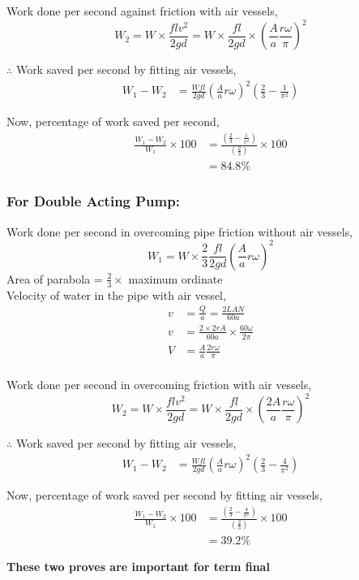 \documentclass{article}
\begin{document}
\begin{multicols}{2}
      Work done per second against friction with air vessels,
      $$W_2 = W \times \frac{f l v^2}{2 g d} = W \times \frac{f l}{2 g d} \times \left(\frac{A}{a} \frac{r \omega}{\pi}\right)^2 $$

      $\therefore$ Work saved per second by fitting air vessels,
      \begin{align*}
        W_1 - W_2 &= \frac{W f l}{2 g d} \left(\frac{A}{a} r \omega\right)^2 \left(\frac{2}{3} - \frac{1}{\pi^2}\right)
      \end{align*}
      
      Now, percentage of work saved per second,
      \begin{align*}
        \frac{W_1 - W_2}{W_1} \times 100 &= \frac{\left(\frac{2}{3} - \frac{1}{\pi^2}\right)}{\left(\frac{2}{3}\right)} \times 100 \\
        &= 84.8 \%
      \end{align*}

      \subsubsection*{For Double Acting Pump:}
      Work done per second in overcoming pipe friction without air vessels,
      $$W_1 = W \times \frac{2}{3} \frac{fl}{2 g d} \left(\frac{A}{a} r \omega \right)^2 $$
      Area of parabola = $\frac{2}{3} \times$ maximum ordinate \\
      Velocity of water in the pipe with air vessel,
      \begin{align*}
        v &= \frac{Q}{a} = \frac{2LAN}{60 a} \\
        v &= \frac{2 \times 2 r A}{60 a}\times \frac{60 \omega}{2 \pi} \\
        V &= \frac{A}{a} \frac{2r \omega}{\pi} \\
      \end{align*}

      Work done per second in overcoming friction with air vessels,
      $$W_2 = W \times \frac{f l v^2}{2 g d} = W \times \frac{f l}{2 g d} \times \left(\frac{2 A}{a} \frac{r \omega}{\pi}\right)^2 $$

      $\therefore$ Work saved per second by fitting air vessels,
      \begin{align*}
        W_1 - W_2 &= \frac{W f l}{2 g d} \left(\frac{A}{a} r \omega\right)^2 \left(\frac{2}{3} - \frac{4}{\pi^2}\right)
      \end{align*}

      Now, percentage of work saved per second by fitting air vessels,
      \begin{align*}
        \frac{W_1 - W_2}{W_1} \times 100 &= \frac{\left(\frac{2}{3} - \frac{4}{\pi^2}\right)}{\left(\frac{2}{3}\right)} \times 100 \\
        &= 39.2 \%
        \end{align*}

      \end{multicols}
      \textbf{These two proves are important for term final} \hrulefill 
\end{document}
